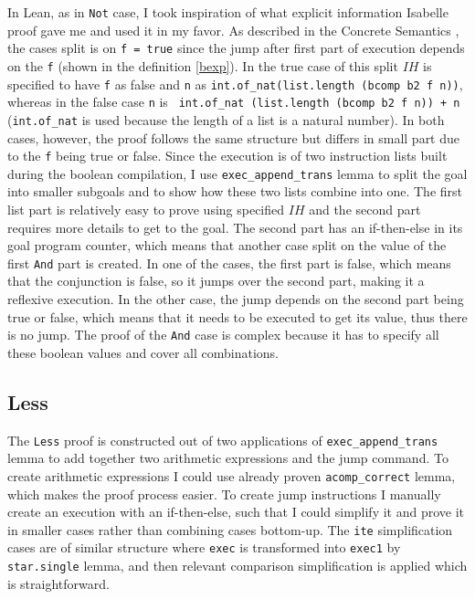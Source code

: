 In Lean, as in \lstinline{Not} case, I took inspiration of what explicit information Isabelle proof gave me and used it in my favor. As described in the Concrete Semantics \cite{isabelle}, the cases split is on \lstinline{f = true} since the jump after first part of execution depends on the \lstinline{f} (shown in the definition \ref{bexp}). In the true case of this split $IH$ is specified to have \lstinline{f} as false and \lstinline{n} as \lstinline{int.of_nat(list.length (bcomp b2 f n))}, whereas in the false case \lstinline{n} is \lstinline{ int.of_nat (list.length (bcomp b2 f n)) + n} (\lstinline{int.of_nat} is used because the length of a list is a natural number). In both cases, however, the proof follows the same structure but differs in small part due to the \lstinline{f} being true or false. Since the execution is of two instruction lists built during the boolean compilation, I use \lstinline{exec_append_trans} lemma to split the goal into smaller subgoals and to show how these two lists combine into one. The first list part is relatively easy to prove using specified $IH$ and the second part requires more details to get to the goal. The second part has an if-then-else in its goal program counter, which means that another case split on the value of the first \lstinline{And} part is created. In one of the cases, the first part is false, which means that the conjunction is false, so it jumps over the second part, making it a reflexive execution. In the other case, the jump depends on the second part being true or false, which means that it needs to be executed to get its value, thus there is no jump. The proof of the \lstinline{And} case is complex because it has to specify all these boolean values and cover all combinations.

\subsection{Less}

The \lstinline{Less} proof is constructed out of two applications of \lstinline{exec_append_trans} lemma to add together two arithmetic expressions and the jump command. To create arithmetic expressions I could use already proven \lstinline{acomp_correct} lemma, which makes the proof process easier. To create jump instructions I manually create an execution with an if-then-else, such that I could simplify it and prove it in smaller cases rather than combining cases bottom-up. The \lstinline{ite} simplification cases are of similar structure where \lstinline{exec} is transformed into \lstinline{exec1} by \lstinline{star.single} lemma, and then relevant comparison simplification is applied which is straightforward. 

